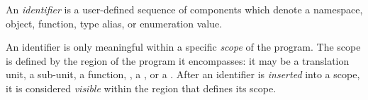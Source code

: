 
\begin{grammar}
\\
\\
 \terminal{::} \\

\exactly\\
\\
 \\

\oneof \\
     
     
 \\
    
     
  \\
     
     
 \\
    
     
  \\
\terminal{\_}\\

\oneof \\
     
   \\

\\
 \\
 \\
\end{grammar}

\specsubitem
An \textit{identifier} is a user-defined sequence of  components
which denote a namespace, object, function, type alias, or enumeration value.

\specsubitem
An identifier is only meaningful within a specific \textit{scope} of the
program. The scope is defined by the region of the program it encompasses: it
may be a translation unit, a sub-unit, a function, , a
, or a . After an
identifier is \textit{inserted} into a scope, it is considered \textit{visible}
within the region that defines its scope.


